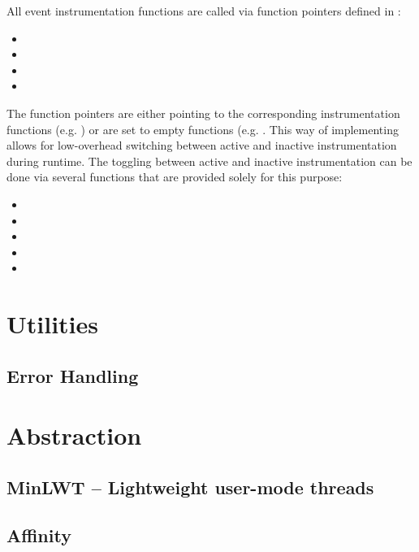 All event instrumentation functions are called via function pointers defined in
:

\begin{itemize} 
	\item {} 
	\item {} 
	\item {} 
	\item {} 
\end{itemize}

The function pointers are either pointing to the corresponding instrumentation
functions (e.g. ) or are set to
empty functions (e.g. . This way
of implementing allows for low-overhead switching between active and inactive
instrumentation during runtime. The toggling between active and inactive
instrumentation can be done via several functions that are provided solely for
this purpose:

\begin{itemize} 
	\item {} 
	\item {} 
	\item {} 
	\item {} 
	\item {} 
\end{itemize}


\section{Utilities} 
\subsection{Error Handling} 
\section{Abstraction}
\subsection{MinLWT -- Lightweight user-mode threads} 
\subsection{Affinity}
